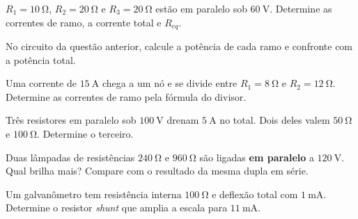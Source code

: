\blocoaplicacao
\begin{questao}[2]{}

$R_1=\SI{10}{\ohm}$, $R_2=\SI{20}{\ohm}$ e $R_3=\SI{20}{\ohm}$ estão em
paralelo sob $\SI{60}{\volt}$. Determine as correntes de ramo, a corrente total
e $R_{eq}$.


\end{questao}
\begin{questao}[2]{}

No circuito da questão anterior, calcule a potência de cada ramo e confronte
com a potência total.


\end{questao}
\begin{questao}[2]{}

Uma corrente de $\SI{15}{\ampere}$ chega a um nó e se divide entre
$R_1=\SI{8}{\ohm}$ e $R_2=\SI{12}{\ohm}$. Determine as correntes de ramo pela
fórmula do divisor.


\end{questao}
\begin{questao}[2]{}

Três resistores em paralelo sob $\SI{100}{\volt}$ drenam $\SI{5}{\ampere}$ no
total. Dois deles valem $\SI{50}{\ohm}$ e $\SI{100}{\ohm}$. Determine o
terceiro.


\end{questao}
\begin{questao}[2]{}

Duas lâmpadas de resistências $\SI{240}{\ohm}$ e $\SI{960}{\ohm}$ são ligadas
\textbf{em paralelo} a $\SI{120}{\volt}$. Qual brilha mais? Compare com o
resultado da mesma dupla em série.


\end{questao}
\begin{questao}[2]{}

Um galvanômetro tem resistência interna $\SI{100}{\ohm}$ e deflexão total com
$\SI{1}{\milli\ampere}$. Determine o resistor \emph{shunt} que amplia a escala
para $\SI{11}{\milli\ampere}$.


\end{questao}
